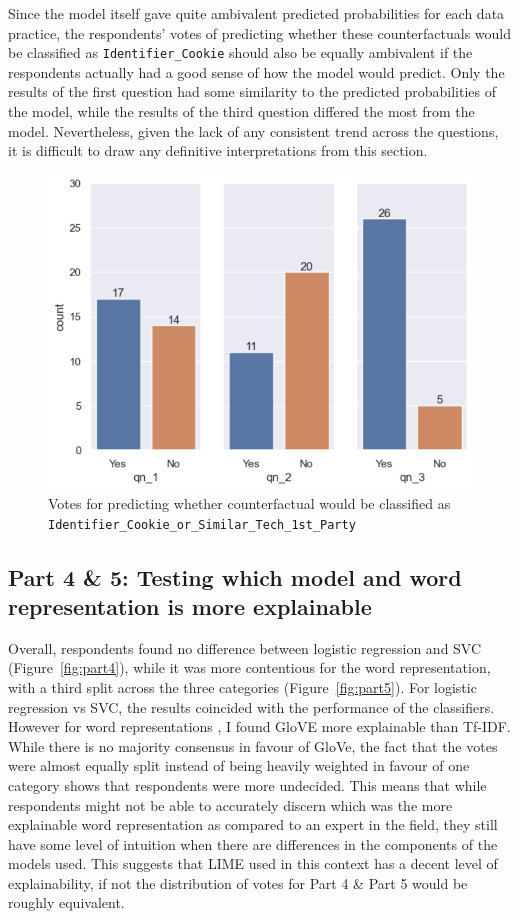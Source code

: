 Since the model itself gave quite ambivalent predicted probabilities for each data practice, the respondents' votes of predicting whether these counterfactuals would be classified as \texttt{Identifier\_Cookie} should also be equally ambivalent if the respondents actually had a good sense of how the model would predict. Only the results of the first question had some similarity to the predicted probabilities of the model, while the results of the third question differed the most from the model. Nevertheless, given the lack of any consistent trend across the questions, it is difficult to draw any definitive interpretations from this section.

\begin{figure}[!ht]
    \centering
    \includegraphics[width=1\linewidth]{figures/part_3_counterfactual.png}
    \caption{Votes for predicting whether counterfactual would be classified as \texttt{Identifier\_Cookie\_or\_Similar\_Tech\_1st\_Party}}
    \label{fig:part3_counterfactual}
\end{figure}

\subsection{Part 4 \& 5: Testing which model and word representation is more explainable}
Overall, respondents found no difference between logistic regression and SVC (Figure~\ref{fig:part4}), while it was more contentious for the word representation, with a third split across the three categories (Figure~\ref{fig:part5}). For logistic regression vs SVC, the results coincided with the performance of the classifiers. However for word representations , I found GloVE more explainable than Tf-IDF. While there is no majority consensus in favour of GloVe, the fact that the votes were almost equally split instead of being heavily weighted in favour of one category shows that respondents were more undecided. This means that while respondents might not be able to accurately discern which was the more explainable word representation as compared to an expert in the field, they still have some level of intuition when there are differences in the components of the models used. This suggests that LIME used in this context has a decent level of explainability, if not the distribution of votes for Part 4 \& Part 5 would be roughly equivalent.

